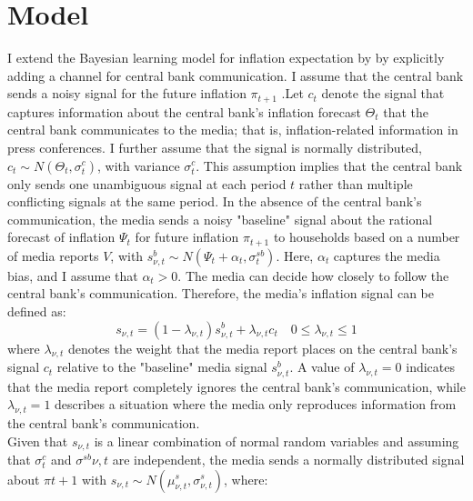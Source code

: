 \documentclass[review]{elsarticle}
\begin{document}
\section{Model}\label{sec:Model} 
I extend the Bayesian learning model for inflation expectation by \cite{LamlaLein2014} by explicitly adding a channel for central bank communication. I assume that the central bank sends a noisy signal for the future inflation $\pi_{t+1}$ 
.Let $c_t$ denote the signal that captures information about the central bank's inflation forecast $\Theta_t$ that the central bank communicates to the media; that is, inflation-related information in press conferences. I further assume that the signal is normally distributed, $c_t \sim N(\Theta_t, \sigma^c_t)$, with variance $\sigma^c_t$. This assumption implies that the central bank only sends one unambiguous signal at each period $t$ rather than multiple conflicting signals at the same period.
In the absence of the central bank's communication, the media sends a noisy "baseline" signal about the rational forecast of inflation $\Psi_t$ for future inflation $\pi_{t+1}$ to households based on a number of media reports $V$, with $s^b_{\nu,t} \sim N(\Psi_t + \alpha_t, \sigma^{sb}_t)$. Here, $\alpha_t$ captures the media bias, and I assume that $\alpha_t > 0$. The media can decide how closely to follow the central bank's communication. Therefore, the media's inflation signal can be defined as:
\begin{equation}
s_{\nu,t} = (1-\lambda_{\nu,t}) s^b_{\nu,t} + \lambda_{\nu,t} c_t \quad 0\leq \lambda_{\nu,t} \leq 1
\end{equation}
where $\lambda_{\nu, t}$ denotes the weight that the media report places on the central bank's signal $c_t$ relative to the "baseline" media signal $s^b_{\nu,t}$. A value of $\lambda_{\nu,t} = 0$ indicates that the media report completely ignores the central bank's communication, while $\lambda_{\nu,t} = 1$ describes a situation where the media only reproduces information from the central bank's communication.
\\
Given that $s_{\nu,t}$ is a linear combination of normal random variables and assuming that $\sigma^c_t$ and $\sigma^{sb}{\nu,t}$ are independent, the media sends a normally distributed signal about $\pi{t+1}$ with $s_{\nu,t} \sim N(\mu^s_{\nu,t}, \sigma^s_{\nu,t})$, where:
\end{document}
